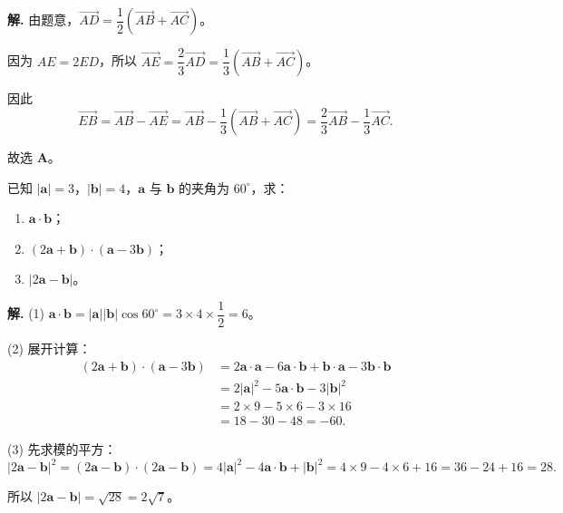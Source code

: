 \documentclass[11pt]{ctexrep}
\begin{document}
\textbf{解.} 由题意，$\overrightarrow{AD} = \dfrac{1}{2}(\overrightarrow{AB} + \overrightarrow{AC})$。

因为 $AE = 2ED$，所以 $\overrightarrow{AE} = \dfrac{2}{3}\overrightarrow{AD} = \dfrac{1}{3}(\overrightarrow{AB} + \overrightarrow{AC})$。

因此
\[
    \overrightarrow{EB} = \overrightarrow{AB} - \overrightarrow{AE} = \overrightarrow{AB} - \dfrac{1}{3}(\overrightarrow{AB} + \overrightarrow{AC}) = \dfrac{2}{3}\overrightarrow{AB} - \dfrac{1}{3}\overrightarrow{AC}.
\]

故选 \textbf{A}。

\begin{example}[数量积的计算]
    已知 $|\boldsymbol{a}| = 3$，$|\boldsymbol{b}| = 4$，$\boldsymbol{a}$ 与 $\boldsymbol{b}$ 的夹角为 $60^{\circ}$，求：
    \begin{enumerate}
        \item $\boldsymbol{a} \cdot \boldsymbol{b}$；
        \item $(2\boldsymbol{a} + \boldsymbol{b}) \cdot (\boldsymbol{a} - 3\boldsymbol{b})$；
        \item $|2\boldsymbol{a} - \boldsymbol{b}|$。
    \end{enumerate}
\end{example}

\textbf{解.} (1) $\boldsymbol{a} \cdot \boldsymbol{b} = |\boldsymbol{a}||\boldsymbol{b}|\cos 60^{\circ} = 3 \times 4 \times \dfrac{1}{2} = 6$。

(2) 展开计算：
\begin{align*}
    (2\boldsymbol{a} + \boldsymbol{b}) \cdot (\boldsymbol{a} - 3\boldsymbol{b}) &= 2\boldsymbol{a} \cdot \boldsymbol{a} - 6\boldsymbol{a} \cdot \boldsymbol{b} + \boldsymbol{b} \cdot \boldsymbol{a} - 3\boldsymbol{b} \cdot \boldsymbol{b} \\
    &= 2|\boldsymbol{a}|^2 - 5\boldsymbol{a} \cdot \boldsymbol{b} - 3|\boldsymbol{b}|^2 \\
    &= 2 \times 9 - 5 \times 6 - 3 \times 16 \\
    &= 18 - 30 - 48 = -60.
\end{align*}

(3) 先求模的平方：
\[
    |2\boldsymbol{a} - \boldsymbol{b}|^2 = (2\boldsymbol{a} - \boldsymbol{b}) \cdot (2\boldsymbol{a} - \boldsymbol{b}) = 4|\boldsymbol{a}|^2 - 4\boldsymbol{a} \cdot \boldsymbol{b} + |\boldsymbol{b}|^2 = 4 \times 9 - 4 \times 6 + 16 = 36 - 24 + 16 = 28.
\]

所以 $|2\boldsymbol{a} - \boldsymbol{b}| = \sqrt{28} = 2\sqrt{7}$。
\end{document}
